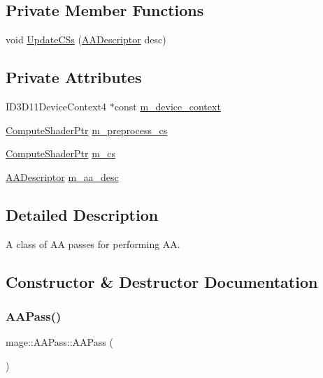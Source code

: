 \subsection*{Private Member Functions}
\begin{DoxyCompactItemize}
\item 
void \hyperlink{classmage_1_1_a_a_pass_ac48a68cdacf75cdf339e8f009e0c2bad}{Update\+C\+Ss} (\hyperlink{namespacemage_a0b400065340fa5cca0ce4c2809d91af1}{A\+A\+Descriptor} desc)
\end{DoxyCompactItemize}
\subsection*{Private Attributes}
\begin{DoxyCompactItemize}
\item 
I\+D3\+D11\+Device\+Context4 $\ast$const \hyperlink{classmage_1_1_a_a_pass_ae5a0a1323cfbb03adeb444e2972c7159}{m\+\_\+device\+\_\+context}
\item 
\hyperlink{namespacemage_a95ee75d4d07106395d80f751d364dc1b}{Compute\+Shader\+Ptr} \hyperlink{classmage_1_1_a_a_pass_a25b8992076f819b52498d3510e499993}{m\+\_\+preprocess\+\_\+cs}
\item 
\hyperlink{namespacemage_a95ee75d4d07106395d80f751d364dc1b}{Compute\+Shader\+Ptr} \hyperlink{classmage_1_1_a_a_pass_adb906c0dedcbaffb04d28ba41a0d7e9f}{m\+\_\+cs}
\item 
\hyperlink{namespacemage_a0b400065340fa5cca0ce4c2809d91af1}{A\+A\+Descriptor} \hyperlink{classmage_1_1_a_a_pass_a2c821aa79093054a95debe6540abd58c}{m\+\_\+aa\+\_\+desc}
\end{DoxyCompactItemize}


\subsection{Detailed Description}
A class of AA passes for performing AA. 

\subsection{Constructor \& Destructor Documentation}
\hypertarget{classmage_1_1_a_a_pass_a252ae39e2a24d3c82294aa9f308877b1}{}\label{classmage_1_1_a_a_pass_a252ae39e2a24d3c82294aa9f308877b1} 
\subsubsection{\texorpdfstring{A\+A\+Pass()}{AAPass()}\hspace{0.1cm}{\footnotesize\ttfamily [1/3]}}
{\footnotesize\ttfamily mage\+::\+A\+A\+Pass\+::\+A\+A\+Pass (\begin{DoxyParamCaption}{ }\end{DoxyParamCaption})}

